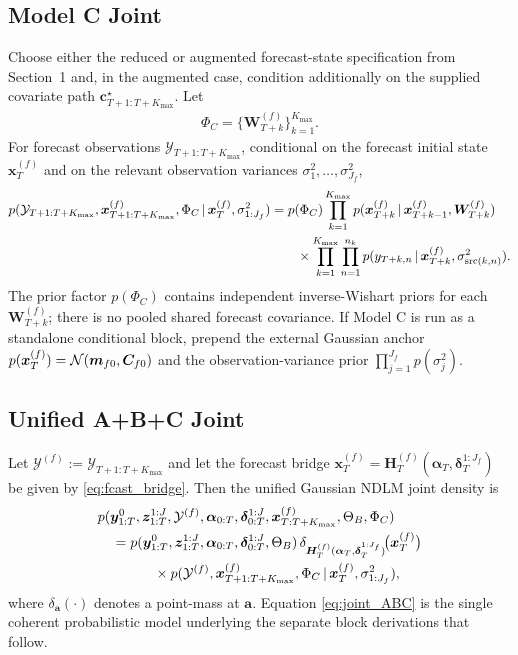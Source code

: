 \subsection{Model C Joint}
Choose either the reduced or augmented forecast-state specification from Section~1 and,
in the augmented case, condition additionally on the supplied covariate path
$\bm c_{T+1:T+K_{\max}}^\star$.
Let
\begin{align}
\Phi_C=\{\bm W_{T+k}^{(f)}\}_{k=1}^{K_{\max}}.
\end{align}
For forecast observations $\mathcal{Y}_{T+1:T+K_{\max}}$, conditional on the forecast initial state
$\bm x_T^{(f)}$ and on the relevant observation variances $\sigma_1^2,\dots,\sigma_{J_f}^2$,
\begin{align}
p(\mathcal{Y}_{T+1:T+K_{\max}},\bm x_{T+1:T+K_{\max}}^{(f)},\Phi_C\,|\, \bm x_T^{(f)},\sigma_{1:J_f}^2)
&= p(\Phi_C)
\prod_{k=1}^{K_{\max}} p(\bm x_{T+k}^{(f)}\,|\,\bm x_{T+k-1}^{(f)},\bm W_{T+k}^{(f)}) \nonumber\\
&\qquad\times
\prod_{k=1}^{K_{\max}}\prod_{n=1}^{n_k} p(y_{T+k,n}\,|\,\bm x_{T+k}^{(f)},\sigma_{\mathrm{src}(k,n)}^2).
\label{eq:joint_C}
\end{align}
The prior factor $p(\Phi_C)$ contains independent inverse-Wishart priors for
each $\bm W_{T+k}^{(f)}$; there is no pooled shared forecast covariance.
If Model C is run as a standalone conditional block, prepend the external Gaussian anchor
$p(\bm x_T^{(f)})=\mathcal{N}(\bm m_{f0},\bm C_{f0})$ and the observation-variance prior
$\prod_{j=1}^{J_f}p(\sigma_j^2)$.

\subsection{Unified A+B+C Joint}
Let $\mathcal{Y}^{(f)}:=\mathcal{Y}_{T+1:T+K_{\max}}$ and let the forecast bridge
$\bm x_T^{(f)}=\bm H_T^{(f)}(\bm\alpha_T,\bm\delta_T^{1:J_f})$ be given by
\eqref{eq:fcast_bridge}. Then the unified Gaussian NDLM joint density is
\begin{align}
&p(\bm y_{1:T}^0,\bm z_{1:T}^{1:J},\mathcal{Y}^{(f)},
\bm\alpha_{0:T},\bm\delta_{0:T}^{1:J},
\bm x_{T:T+K_{\max}}^{(f)},\Theta_B,\Phi_C) \nonumber\\
&\quad=
p(\bm y_{1:T}^0,\bm z_{1:T}^{1:J},\bm\alpha_{0:T},\bm\delta_{0:T}^{1:J},\Theta_B)\,
\delta_{\bm H_T^{(f)}(\bm\alpha_T,\bm\delta_T^{1:J_f})}\!\big(\bm x_T^{(f)}\big) \nonumber\\
&\qquad\qquad\times
p(\mathcal{Y}^{(f)},\bm x_{T+1:T+K_{\max}}^{(f)},\Phi_C\,|\, \bm x_T^{(f)},\sigma_{1:J_f}^2),
\label{eq:joint_ABC}
\end{align}
where $\delta_{\bm a}(\cdot)$ denotes a point-mass at $\bm a$.
Equation \eqref{eq:joint_ABC} is the single coherent probabilistic model underlying the separate
block derivations that follow.


